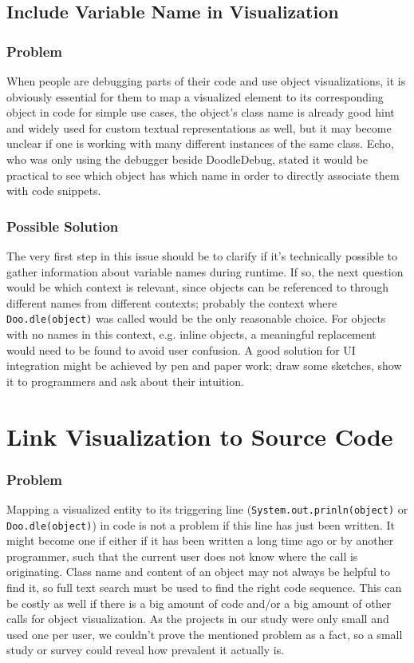 \documentclass[a4paper,ngerman,english]{amsbook} %
\begin{document}
\subsection{Include Variable Name in Visualization}

\subsubsection{Problem} When people are debugging parts of their code and use object visualizations, it is obviously essential for them to map a visualized element to its corresponding object in code for simple use cases, the object's class name is already good hint and widely used for custom textual representations as well\cite{dd-study}, but it may become unclear if one is working with many different instances of the same class. Echo, who was only using the debugger beside DoodleDebug, stated it would be practical to see which object has which name in order to directly associate them with code snippets.

\subsubsection{Possible Solution}
The very first step in this issue should be to clarify if it's technically possible to gather information about variable names during runtime. If so, the next question would be which context is relevant, since objects can be referenced to through different names from different contexts; probably the context where \verb-Doo.dle(object)- was called would be the only reasonable choice. For objects with no names in this context, e.g. inline objects, a meaningful replacement would need to be found to avoid user confusion. A good solution for UI integration might be achieved by pen and paper work; draw some sketches, show it to programmers and ask about their intuition.

\section{Link Visualization to Source Code}
\subsubsection{Problem}
Mapping a visualized entity to its triggering line (\verb-System.out.prinln(object)- or \verb-Doo.dle(object)-) in code is not a problem if this line has just been written. It might become one if either if it has been written a long time ago or by another programmer, such that the current user does not know where the call is originating. Class name and content of an object may not always be helpful to find it, so full text search must be used to find the right code sequence. This can be costly as well if there is a big amount of code and/or a big amount of other calls for object visualization. As the projects in our study were only small and used one per user, we couldn't prove the mentioned problem as a fact, so a small study or survey could reveal how prevalent it actually is.
\end{document}
